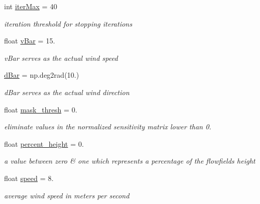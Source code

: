 \begin{DoxyCompactItemize}
int \mbox{\hyperlink{classvisualization__manager___d_j_1_1_visualization_manager_1_1params_a99549a1db9cbefd0e90fda89327a9716}{iter\+Max}} = 40
\begin{DoxyCompactList}\small\item\em iteration threshold for stopping iterations \end{DoxyCompactList}\item 
float \mbox{\hyperlink{classvisualization__manager___d_j_1_1_visualization_manager_1_1params_a468678d5806ec035d997a40604e291f2}{v\+Bar}} = 15.
\begin{DoxyCompactList}\small\item\em v\+Bar serves as the \textquotesingle{}actual\textquotesingle{} wind speed \end{DoxyCompactList}\item 
\mbox{\hyperlink{classvisualization__manager___d_j_1_1_visualization_manager_1_1params_a1d8f5168d09370406c83401b9e7b66d0}{d\+Bar}} = np.\+deg2rad(10.)
\begin{DoxyCompactList}\small\item\em d\+Bar serves as the \textquotesingle{}actual\textquotesingle{} wind direction \end{DoxyCompactList}\item 
float \mbox{\hyperlink{classvisualization__manager___d_j_1_1_visualization_manager_1_1params_adf7683637957ed529a967c846eb9f7b5}{mask\+\_\+thresh}} = 0.
\begin{DoxyCompactList}\small\item\em eliminate values in the normalized sensitivity matrix lower than 0. \end{DoxyCompactList}\item 
float \mbox{\hyperlink{classvisualization__manager___d_j_1_1_visualization_manager_1_1params_a7cee09abb8816bfc56733ba475592e01}{percent\+\_\+height}} = 0.
\begin{DoxyCompactList}\small\item\em a value between zero \& one which represents a percentage of the flowfield\textquotesingle{}s height \end{DoxyCompactList}\item 
float \mbox{\hyperlink{classvisualization__manager___d_j_1_1_visualization_manager_1_1params_af67bd6887a2486bd05116fca8ecbfe08}{speed}} = 8.
\begin{DoxyCompactList}\small\item\em average wind speed in meters per second \end{DoxyCompactList}\item 

\end{DoxyCompactItemize}
